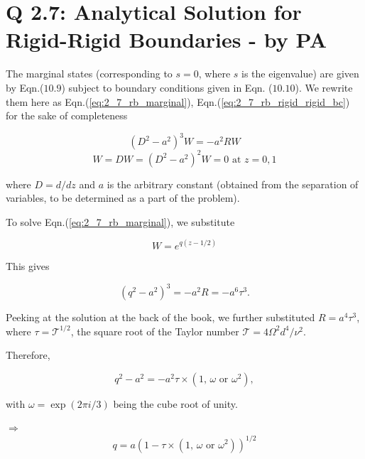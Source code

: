 \section{Q 2.7: Analytical Solution for Rigid-Rigid Boundaries - by PA}
The marginal states (corresponding to $s=0$, where $s$ is the eigenvalue) are given by Eqn.($10.9$) subject to boundary conditions given in Eqn. ($10.10$). We rewrite them here as Eqn.(\ref{eq:2_7_rb_marginal}), Eqn.(\ref{eq:2_7_rb_rigid_rigid_bc}) for the sake of completeness 

\begin{equation}\label{eq:2_7_rb_marginal}
 (D^{2}-a^{2})^{3} W = - a^{2} R W
\end{equation}
\begin{equation}\label{eq:2_7_rb_rigid_rigid_bc}
 W = DW = (D^{2}-a^{2})^{2} W = 0 \textrm{ at } z = 0, 1
\end{equation}

where $D = d/dz$ and $a$ is the arbitrary constant (obtained from the separation of variables, to be determined as a part of the problem). 

To solve Eqn.(\ref{eq:2_7_rb_marginal}), we substitute 

\begin{equation}\label{eq:2_7_W_ansatz}
W = e^{q(z-1/2)}  
\end{equation}

This gives

\begin{equation}\label{eq:2_7_rb_marginal_roots}
 (q^{2}-a^{2})^{3} = - a^{2} R = -a^{6} \tau^{3}.
\end{equation}

Peeking at the solution at the back of the book, we further substituted $R = a^{4}\tau^{3}$, where $\tau = \mathcal{T}^{1/2}$, the square root of the Taylor number $\mathcal{T} = 4\Omega^{2}d^{4}/\nu^{2}$. 

Therefore, 

\begin{equation}
 q^{2}-a^{2} = -a^{2}\tau \times (1 \textrm{, } \omega \textrm{ or } \omega^{2}),
\end{equation}

with $\omega = \exp{(2\pi i/3)}$ being the cube root of unity.

$\Rightarrow$
$$q = a (1- \tau \times (1 \textrm{, } \omega \textrm{ or } \omega^{2}))^{1/2} $$

